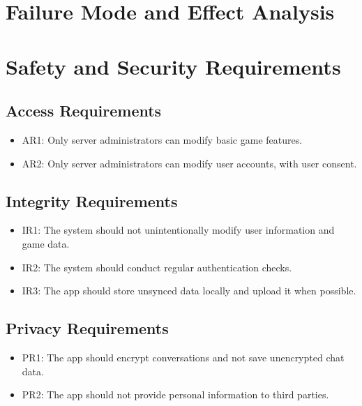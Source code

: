 \documentclass{article}
\begin{document}
\section{Failure Mode and Effect Analysis}

\section{Safety and Security Requirements}
\subsection{Access Requirements}
\begin{itemize}
    \item AR1: Only server administrators can modify basic game features.
    \item AR2: Only server administrators can modify user accounts, with user consent.
\end{itemize}

\subsection{Integrity Requirements}
\begin{itemize}
    \item IR1: The system should not unintentionally modify user information and game data.
    \item IR2: The system should conduct regular authentication checks.
    \item IR3: The app should store unsynced data locally and upload it when possible.
\end{itemize}

\subsection{Privacy Requirements}
\begin{itemize}
    \item PR1: The app should encrypt conversations and not save unencrypted chat data.
    \item PR2: The app should not provide personal information to third parties.
\end{itemize}
\end{document}
